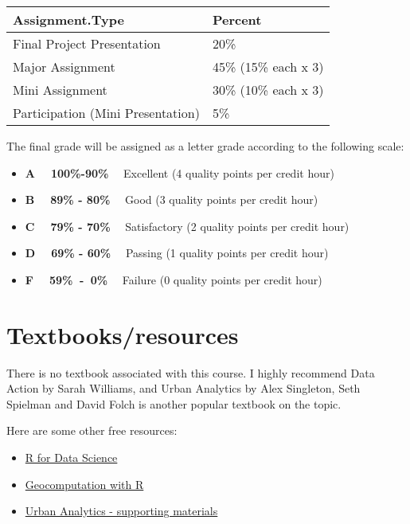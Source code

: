 \documentclass[
]{article}
\providecommand{\tightlist}{%
  \setlength{\itemsep}{0pt}\setlength{\parskip}{0pt}}
\begin{document}
\begin{table}
\centering
\begin{tabular}[t]{l|l}
\hline
Assignment.Type & Percent\\
\hline
Final Project Presentation & 20\%\\
\hline
Major Assignment & 45\% (15\% each x 3)\\
\hline
Mini Assignment & 30\% (10\% each x 3)\\
\hline
Participation (Mini Presentation) & 5\%\\
\hline
\end{tabular}
\end{table}

The final grade will be assigned as a letter grade according to the
following scale:

\begin{itemize}
\tightlist
\item
  \textbf{A \(~~~\) 100\%-90\%} \(~~~\) Excellent (4 quality points per
  credit hour)
\item
  \textbf{B \(~~~\) 89\% - 80\%} \(~~~\) Good (3 quality points per
  credit hour)
\item
  \textbf{C \(~~~\) 79\% - 70\%} \(~~~\) Satisfactory (2 quality points
  per credit hour)
\item
  \textbf{D \(~~~\) 69\% - 60\%} \(~~~\) Passing (1 quality points per
  credit hour)
\item
  \textbf{F \(~~~\) 59\% \(~\)-\(~\) 0\%} \(~~~\) Failure (0 quality
  points per credit hour)
\end{itemize}

\hypertarget{textbooksresources}{%
\section{Textbooks/resources}\label{textbooksresources}}

There is no textbook associated with this course. I highly recommend
Data Action by Sarah Williams, and Urban Analytics by Alex Singleton,
Seth Spielman and David Folch is another popular textbook on the topic.

Here are some other free resources:

\begin{itemize}
\tightlist
\item
  \href{https://r4ds.had.co.nz/}{R for Data Science}
\item
  \href{https://rpubs.com/spring19cp6521/Syllabus}{Geocomputation with
  R}
\item
  \href{https://github.com/alexsingleton/urban_analytics}{Urban
  Analytics - supporting materials}
\end{itemize}
\end{document}
